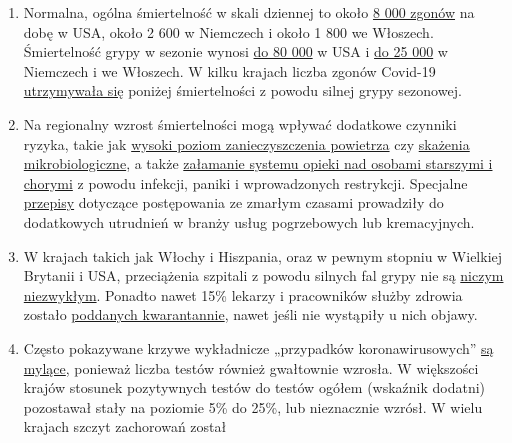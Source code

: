 \begin{enumerate}
{  lat}.
\item
  Normalna, ogólna śmiertelność w skali dziennej to około
  \href{https://www.cdc.gov/mmwr/volumes/68/wr/mm6826a5.htm}{8 000
  zgonów} na dobę w USA, około 2 600 w Niemczech i około 1 800 we
  Włoszech. Śmiertelność grypy w sezonie wynosi
  \href{https://www.statnews.com/2018/09/26/cdc-us-flu-deaths-winter/}{do
  80 000} w USA i
  \href{https://www.sciencedirect.com/science/article/pii/S1201971219303285}{do
  25 000} w Niemczech i we Włoszech. W kilku krajach liczba zgonów
  Covid-19 \href{https://www.euromomo.eu/graphs-and-maps/}{utrzymywała
  się} poniżej śmiertelności z powodu silnej grypy sezonowej.
\item
  Na regionalny wzrost śmiertelności mogą wpływać dodatkowe czynniki
  ryzyka, takie jak
  \href{https://www.theguardian.com/environment/2020/apr/20/air-pollution-may-be-key-contributor-to-covid-19-deaths-study?utm_medium}{wysoki
  poziom zanieczyszczenia powietrza} czy
  \href{https://www.ansa.it/english/news/science_tecnology/2019/11/19/italy-top-in-eu-in-antibiotic-resistance_369e0123-0107-445e-8c17-f11932c9d27c.html}{skażenia
  mikrobiologiczne}, a także
  \href{https://swprs.org/covid-19-a-report-from-italy/}{załamanie
  systemu opieki nad osobami starszymi i chorymi} z powodu infekcji,
  paniki i wprowadzonych restrykcji. Specjalne
  \href{https://www.ecdc.europa.eu/sites/default/files/documents/COVID-19-safe-handling-of-bodies-or-persons-dying-from-COVID19.pdf}{przepisy}
  dotyczące postępowania ze zmarłym czasami prowadziły do dodatkowych
  utrudnień w branży usług pogrzebowych lub kremacyjnych.
\item
  W krajach takich jak Włochy i Hiszpania, oraz w pewnym stopniu w
  Wielkiej Brytanii i USA, przeciążenia szpitali z powodu silnych fal
  grypy nie są
  \href{https://off-guardian.org/2020/04/02/coronavirus-fact-check-1-flu-doesnt-overwhelm-our-hospitals/}{niczym
  niezwykłym}. Ponadto nawet 15\% lekarzy i pracowników służby zdrowia
  zostało
  \href{https://www.reuters.com/article/us-health-coronavirus-spain-morgue-idUSKBN21B1PP}{poddanych
  kwarantannie}, nawet jeśli nie wystąpiły u nich objawy.
\item
  Często pokazywane krzywe wykładnicze „przypadków koronawirusowych''
  \href{https://fivethirtyeight.com/features/coronavirus-case-counts-are-meaningless/}{są
  mylące}, ponieważ liczba testów również gwałtownie wzrosła. W
  większości krajów stosunek pozytywnych testów do testów ogółem
  (wskaźnik dodatni) pozostawał stały na poziomie 5\% do 25\%, lub
  nieznacznie wzrósł. W wielu krajach szczyt zachorowań został

\end{enumerate}

